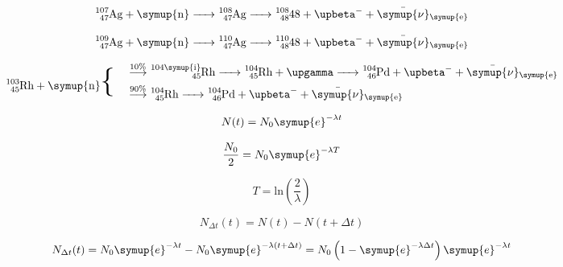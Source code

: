 \begin{equation}
   \ce{^{107}_{47}\text{Ag} + \symup{n} -> ^{108}_{47}\text{Ag} -> ^{108}_{48}\text{48} + $\upbeta$^- + \bar{\symup{\nu}}_{\symup{e}}} \nonumber
\end{equation}

\begin{equation}
   \ce{^{109}_{47}\text{Ag} + \symup{n} -> ^{110}_{47}\text{Ag} -> ^{110}_{48}\text{48} + $\upbeta$^- + \bar{\symup{\nu}}_{\symup{e}}} \nonumber
\end{equation}

\begin{equation}
   \begin{split}
      \ce{^{103}_{45}\text{Rh} + \symup{n}} \mathbin{\scalebox{2.5} \textbraceleft } \quad \nonumber
   \end{split}
   \begin{split}
      &\overset{10\%}{\longrightarrow} \ce{^{104\symup{i}}_{45}\text{Rh} -> ^{104}_{45}\text{Rh} + $\upgamma$ -> ^{104}_{46}\text{Pd} + $\upbeta$^- + \bar{\symup{\nu}}_{\symup{e}} } \nonumber\\
      &\overset{90\%}{\longrightarrow} \ce{^{104}_{45}\text{Rh} -> ^{104}_{46}\text{Pd} + $\upbeta$^- +\bar{\symup{\nu}}_{\symup{e}} } \nonumber\\
   \end{split}
\end{equation}

\begin{equation}
   N(t) = N_0 \symup{e}^{- \lambda t} \nonumber
\end{equation}

\begin{equation}
   \frac{N_0}{2} = N_0 \symup{e}^{- \lambda T}  \nonumber
\end{equation}

\begin{equation}
   T = \text{ln}\left(\frac{2}{\lambda}\right) \nonumber
\end{equation}

\begin{equation}
   N_{\Delta t}(t) = N(t) - N(t + \Delta t) \nonumber
\end{equation}

\begin{equation}
   N_{\Delta t}(t) = N_0 \symup{e}^{ - \lambda t} - N_0 \symup{e}^{- \lambda \left( t + \Delta t \right) } = N_0 \left( 1 - \symup{e}^{-\lambda \Delta t} \right) \symup{e}^{-\lambda t} \nonumber
\end{equation}

